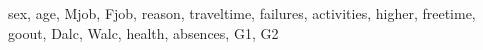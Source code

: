 sex, age, Mjob, Fjob, reason, traveltime, failures, activities, higher, freetime, goout, Dalc, Walc, health, absences, G1, G2
